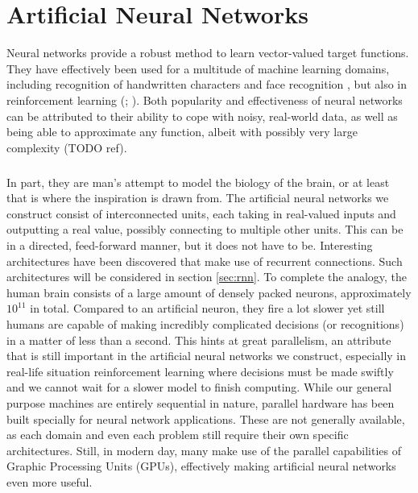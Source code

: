\chapter{Artificial Neural Networks}
Neural networks provide a robust method to learn
vector-valued target functions.
They have effectively been used for a multitude of machine learning domains,
including recognition of handwritten characters
\parencite{LeCun1989}
and
face recognition
\parencite{Cottreil1991},
but also in reinforcement learning
(\cite{anderson1989}; \cite{lin1993}). %
Both popularity and effectiveness of neural networks can be attributed to
their ability to cope with noisy, real-world data,
as well as being able to approximate any function,
albeit with possibly very large complexity (TODO ref).

\paragraph{}
In part, they are man's attempt
to model the biology of the brain,
or at least that is where the inspiration is drawn from.
The artificial neural networks we construct
consist of interconnected units,
each taking in real-valued inputs
and outputting a real value,
possibly connecting to multiple other units.
This can be in a directed, feed-forward manner,
but it does not have to be.
Interesting architectures have been discovered
that make use of recurrent connections.
Such architectures will be considered in
section \ref{sec:rnn}.
To complete the analogy,
the human brain consists of a large amount of densely packed neurons,
approximately $10^{11}$ in total.
Compared to an artificial neuron,
they fire a lot slower
yet still humans are capable of
making incredibly complicated decisions
(or recognitions)
in a matter of less than a second.
This hints at great parallelism,
an attribute that is still important
in the artificial neural networks we construct,
especially in real-life situation reinforcement learning
where decisions must be made swiftly and we cannot wait
for a slower model to finish computing.
While our general purpose machines
are entirely sequential in nature,
parallel hardware has been built specially
for neural network applications.
These are not generally available,
as each domain and even each problem
still require their own specific architectures.
Still, in modern day, many make use
of the parallel capabilities of
Graphic Processing Units (GPUs),
effectively making artificial neural networks even more useful.

